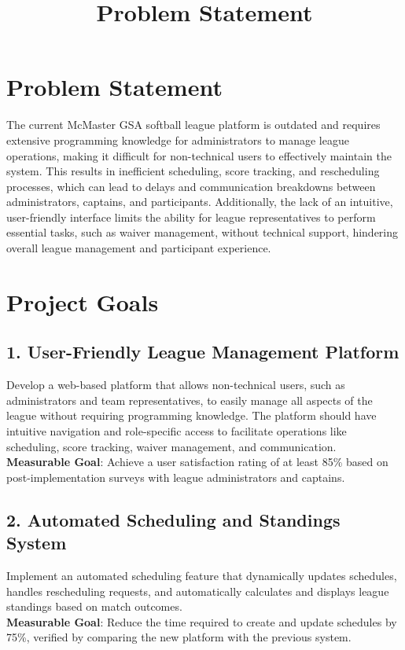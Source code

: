 \documentclass{article}
\title{Problem Statement}
\begin{document}
\section*{Problem Statement}

The current McMaster GSA softball league platform is outdated and requires extensive programming knowledge for administrators to manage league operations, making it difficult for non-technical users to effectively maintain the system. This results in inefficient scheduling, score tracking, and rescheduling processes, which can lead to delays and communication breakdowns between administrators, captains, and participants. Additionally, the lack of an intuitive, user-friendly interface limits the ability for league representatives to perform essential tasks, such as waiver management, without technical support, hindering overall league management and participant experience.

\section*{Project Goals}

\subsection*{1. User-Friendly League Management Platform}
Develop a web-based platform that allows non-technical users, such as administrators and team representatives, to easily manage all aspects of the league without requiring programming knowledge. The platform should have intuitive navigation and role-specific access to facilitate operations like scheduling, score tracking, waiver management, and communication. \\
\textbf{Measurable Goal}: Achieve a user satisfaction rating of at least 85\% based on post-implementation surveys with league administrators and captains.

\subsection*{2. Automated Scheduling and Standings System}
Implement an automated scheduling feature that dynamically updates schedules, handles rescheduling requests, and automatically calculates and displays league standings based on match outcomes. \\
\textbf{Measurable Goal}: Reduce the time required to create and update schedules by 75\%, verified by comparing the new platform with the previous system.
\end{document}
